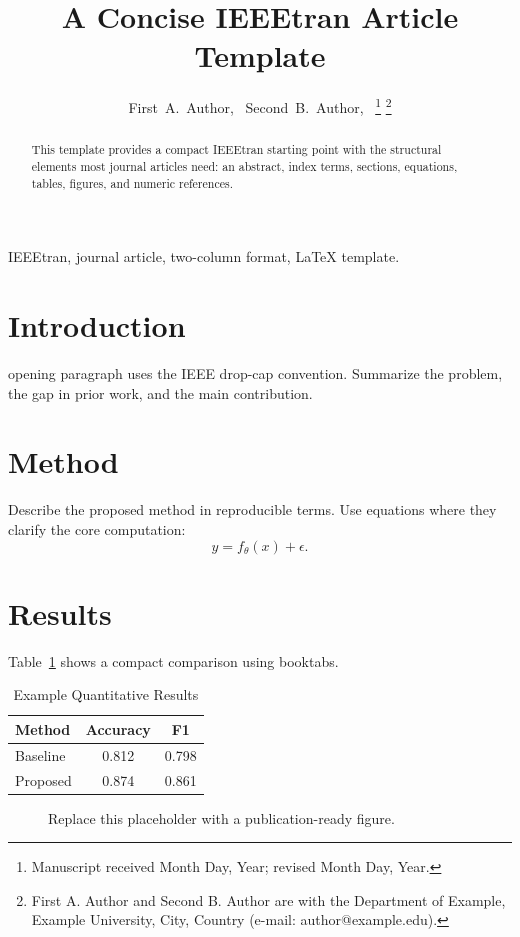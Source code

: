 \documentclass[journal,10pt]{IEEEtran}
\title{A Concise IEEEtran Article Template}
\author{First~A.~Author,~\IEEEmembership{Member,~IEEE,}
        Second~B.~Author,~\IEEEmembership{Senior~Member,~IEEE}
\thanks{Manuscript received Month Day, Year; revised Month Day, Year.}
\thanks{First A. Author and Second B. Author are with the Department of Example, Example University, City, Country (e-mail: author@example.edu).}}
\begin{document}
\maketitle

\begin{abstract}
This template provides a compact IEEEtran starting point with the structural
elements most journal articles need: an abstract, index terms, sections,
equations, tables, figures, and numeric references.
\end{abstract}

\begin{IEEEkeywords}
IEEEtran, journal article, two-column format, LaTeX template.
\end{IEEEkeywords}

\section{Introduction}
 opening paragraph uses the IEEE drop-cap convention.
Summarize the problem, the gap in prior work, and the main contribution.

\section{Method}
Describe the proposed method in reproducible terms. Use equations where they
clarify the core computation:
\begin{equation}
  y = f_{\theta}(x) + \epsilon.
\end{equation}

\section{Results}
Table~\ref{tab:results} shows a compact comparison using booktabs.

\begin{table}[!t]
\caption{Example Quantitative Results}
\label{tab:results}
\centering
\begin{tabular}{lcc}
\toprule
Method & Accuracy & F1 \\
\midrule
Baseline & 0.812 & 0.798 \\
Proposed & 0.874 & 0.861 \\
\bottomrule
\end{tabular}
\end{table}

\begin{figure}[!t]
\centering
\fbox{\rule{0pt}{1.1in}\rule{0.9\columnwidth}{0pt}}
\caption{Replace this placeholder with a publication-ready figure.}
\label{fig:placeholder}
\end{figure}
\end{document}
